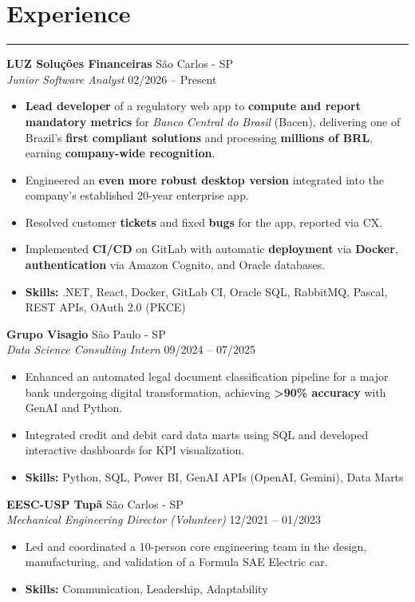 \documentclass[10pt,a4paper]{article}
\begin{document}
\section*{Experience}
\hrule \vspace{2mm}
\textbf{LUZ Soluções Financeiras} \hfill São Carlos - SP \\
\textit{Junior Software Analyst} \hfill 02/2026 -- Present
\begin{itemize}[nosep]
    \item \textbf{Lead developer} of a regulatory web app to \textbf{compute and report mandatory metrics} for \textit{Banco Central do Brasil} (Bacen), delivering one of Brazil's \textbf{first compliant solutions} and processing \textbf{millions of BRL}, earning \textbf{company-wide recognition}.
    \item Engineered an \textbf{even more robust desktop version} integrated into the company's established 20-year enterprise app.
    \item Resolved customer \textbf{tickets} and fixed \textbf{bugs} for the app, reported via CX.
    \item Implemented \textbf{CI/CD} on GitLab with automatic \textbf{deployment} via \textbf{Docker}, \textbf{authentication} via Amazon Cognito, and Oracle databases.
    \item \textbf{Skills:} .NET, React, Docker, GitLab CI, Oracle SQL, RabbitMQ, Pascal, REST APIs, OAuth 2.0 (PKCE)
\end{itemize}

\vspace{1mm}
\textbf{Grupo Visagio} \hfill São Paulo - SP \\
\textit{Data Science Consulting Intern} \hfill 09/2024 -- 07/2025
\begin{itemize}[nosep]
    \item Enhanced an automated legal document classification pipeline for a major bank undergoing digital transformation, achieving \textbf{>90\% accuracy} with GenAI and Python.
    \item Integrated credit and debit card data marts using SQL and developed interactive dashboards for KPI visualization.
    \item \textbf{Skills:} Python, SQL, Power BI, GenAI APIs (OpenAI, Gemini), Data Marts
\end{itemize}

\vspace{1mm}
\textbf{EESC-USP Tupã} \hfill São Carlos - SP \\
\textit{Mechanical Engineering Director (Volunteer)} \hfill 12/2021 -- 01/2023
\begin{itemize}[nosep]
    \item Led and coordinated a 10-person core engineering team in the design, manufacturing, and validation of a Formula SAE Electric car. 
    \item \textbf{Skills:} Communication, Leadership, Adaptability
\end{itemize}
\end{document}
